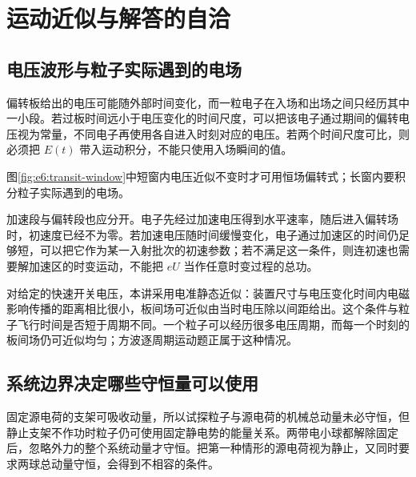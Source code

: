 \section{运动近似与解答的自洽}
\subsection{电压波形与粒子实际遇到的电场}

偏转板给出的电压可能随外部时间变化，而一粒电子在入场和出场之间只经历其中一小段。若过板时间远小于电压变化的时间尺度，可以把该电子通过期间的偏转电压视为常量，不同电子再使用各自进入时刻对应的电压。若两个时间尺度可比，则必须把 $E(t)$ 带入运动积分，不能只使用入场瞬间的值。

\par 图\ref{fig:e6:transit-window}中短窗内电压近似不变时才可用恒场偏转式；长窗内要积分粒子实际遇到的电场。

加速段与偏转段也应分开。电子先经过加速电压得到水平速率，随后进入偏转场时，初速度已经不为零。若加速电压随时间缓慢变化，电子通过加速区的时间仍足够短，可以把它作为某一入射批次的初速参数；若不满足这一条件，则连初速也需要解加速区的时变运动，不能把 $eU$ 当作任意时变过程的总功。

对给定的快速开关电压，本讲采用电准静态近似：装置尺寸与电压变化时间内电磁影响传播的距离相比很小，板间场可近似由当时电压除以间距给出。这个条件与粒子飞行时间是否短于周期不同。一个粒子可以经历很多电压周期，而每一个时刻的板间场仍可近似均匀；方波逐周期运动题正属于这种情况。

\subsection{系统边界决定哪些守恒量可以使用}

固定源电荷的支架可吸收动量，所以试探粒子与源电荷的机械总动量未必守恒，但静止支架不作功时粒子仍可使用固定静电势的能量关系。两带电小球都解除固定后，忽略外力的整个系统动量才守恒。把第一种情形的源电荷视为静止，又同时要求两球总动量守恒，会得到不相容的条件。

